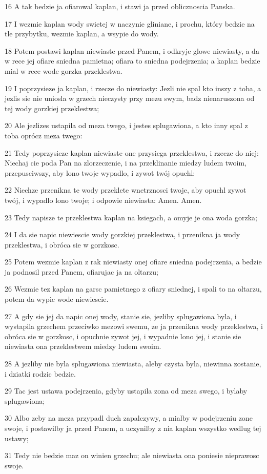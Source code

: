 \par 16 A tak bedzie ja ofiarowal kaplan, i stawi ja przed oblicznoscia Panska.
\par 17 I wezmie kaplan wody swietej w naczynie gliniane, i prochu, który bedzie na tle przybytku, wezmie kaplan, a wsypie do wody.
\par 18 Potem postawi kaplan niewiaste przed Panem, i odkryje glowe niewiasty, a da w rece jej ofiare sniedna pamietna; ofiara to sniedna podejrzenia; a kaplan bedzie mial w rece wode gorzka przeklestwa.
\par 19 I poprzysieze ja kaplan, i rzecze do niewiasty: Jezli nie spal kto inszy z toba, a jezlis sie nie uniosla w grzech nieczysty przy mezu swym, badz nienaruszona od tej wody gorzkiej przeklestwa;
\par 20 Ale jezlizes ustapila od meza twego, i jestes splugawiona, a kto inny spal z toba oprócz meza twego:
\par 21 Tedy poprzysieze kaplan niewiaste one przysiega przeklestwa, i rzecze do niej: Niechaj cie poda Pan na zlorzeczenie, i na przeklinanie miedzy ludem twoim, przepusciwszy, aby lono twoje wypadlo, i zywot twój opuchl:
\par 22 Niechze przenikna te wody przeklete wnetrznosci twoje, aby opuchl zywot twój, i wypadlo lono twoje; i odpowie niewiasta: Amen. Amen.
\par 23 Tedy napisze te przeklestwa kaplan na ksiegach, a omyje je ona woda gorzka;
\par 24 I da sie napic niewiescie wody gorzkiej przeklestwa, i przenikna ja wody przeklestwa, i obróca sie w gorzkosc.
\par 25 Potem wezmie kaplan z rak niewiasty onej ofiare sniedna podejrzenia, a bedzie ja podnosil przed Panem, ofiarujac ja na oltarzu;
\par 26 Wezmie tez kaplan na garsc pamietnego z ofiary sniednej, i spali to na oltarzu, potem da wypic wode niewiescie.
\par 27 A gdy sie jej da napic onej wody, stanie sie, jezliby splugawiona byla, i wystapila grzechem przeciwko mezowi swemu, ze ja przenikna wody przeklestwa, i obróca sie w gorzkosc, i opuchnie zywot jej, i wypadnie lono jej, i stanie sie niewiasta ona przeklestwem miedzy ludem swoim.
\par 28 A jezliby nie byla splugawiona niewiasta, aleby czysta byla, niewinna zostanie, i dziatki rodzic bedzie.
\par 29 Tac jest ustawa podejrzenia, gdyby ustapila zona od meza swego, i bylaby splugawiona;
\par 30 Albo zeby na meza przypadl duch zapalczywy, a mialby w podejrzeniu zone swoje, i postawilby ja przed Panem, a uczynilby z nia kaplan wszystko wedlug tej ustawy;
\par 31 Tedy nie bedzie maz on winien grzechu; ale niewiasta ona poniesie nieprawosc swoje.

